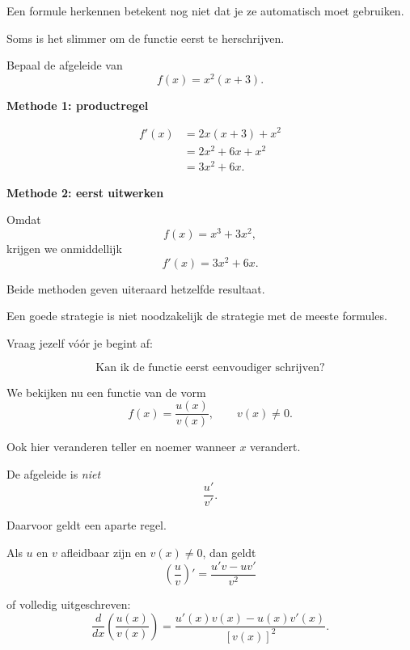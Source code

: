 \documentclass{ximera}
\begin{document}

Een formule herkennen betekent nog niet dat je ze automatisch moet
gebruiken.

Soms is het slimmer om de functie eerst te herschrijven.

\begin{voorbeeld}
Bepaal de afgeleide van
\[
f(x)=x^2(x+3).
\]

\textbf{Methode 1: productregel}

\[
\begin{aligned}
f'(x)
&=2x(x+3)+x^2\\
&=2x^2+6x+x^2\\
&=3x^2+6x.
\end{aligned}
\]

\textbf{Methode 2: eerst uitwerken}

Omdat
\[
f(x)=x^3+3x^2,
\]
krijgen we onmiddellijk
\[
f'(x)=3x^2+6x.
\]

Beide methoden geven uiteraard hetzelfde resultaat.
\end{voorbeeld}

\begin{opmerking}
Een goede strategie is niet noodzakelijk de strategie met de
meeste formules.

Vraag jezelf vóór je begint af:

\[
\boxed{\text{Kan ik de functie eerst eenvoudiger schrijven?}}
\]
\end{opmerking}




We bekijken nu een functie van de vorm
\[
f(x)=\frac{u(x)}{v(x)},
\qquad
v(x)\neq0.
\]

Ook hier veranderen teller en noemer wanneer $x$ verandert.

De afgeleide is \emph{niet}
\[
\frac{u'}{v'}.
\]

Daarvoor geldt een aparte regel.

\begin{eigenschap}[Quotiëntregel]
Als $u$ en $v$ afleidbaar zijn en $v(x)\neq0$, dan geldt
\[
\boxed{
\left(\frac{u}{v}\right)'
=
\frac{u'v-uv'}{v^2}
}
\]

of volledig uitgeschreven:
\[
\boxed{
\frac{d}{dx}
\left(
\frac{u(x)}{v(x)}
\right)
=
\frac{
u'(x)v(x)-u(x)v'(x)
}{
[v(x)]^2
}.
}
\]
\end{eigenschap}
\end{document}
